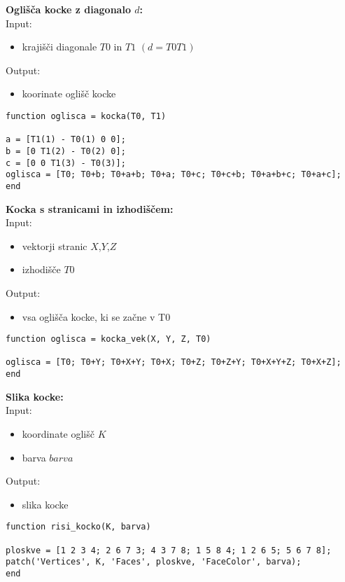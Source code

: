 \documentclass[12pt,a4paper,twoside]{article}
\theoremstyle{definition} %
\theoremstyle{plain} %
\numberwithin{equation}{section}  %
\begin{document}
\textbf{Oglišča kocke z diagonalo $d$:}\\
Input:
\begin{itemize}
\item krajišči diagonale $T0$ in $T1$ $(d=T0 T1)$
\end{itemize}
Output:
\begin{itemize}
\item koorinate oglišč kocke
\end{itemize}

\begin{lstlisting}[caption = {kocka}]
function oglisca = kocka(T0, T1)

a = [T1(1) - T0(1) 0 0];
b = [0 T1(2) - T0(2) 0];
c = [0 0 T1(3) - T0(3)];
oglisca = [T0; T0+b; T0+a+b; T0+a; T0+c; T0+c+b; T0+a+b+c; T0+a+c];
end
\end{lstlisting}

\vspace{1cm}
\textbf{Kocka s stranicami in izhodiščem:}\\
Input:
\begin{itemize}
\item vektorji stranic $X$,$Y$,$Z$
\item izhodišče $T0$
\end{itemize}
Output:
\begin{itemize}
\item vsa oglišča kocke, ki se začne v T0
\end{itemize}

\begin{lstlisting}[caption = {kocka\_vek}]
function oglisca = kocka_vek(X, Y, Z, T0)

oglisca = [T0; T0+Y; T0+X+Y; T0+X; T0+Z; T0+Z+Y; T0+X+Y+Z; T0+X+Z];
end
\end{lstlisting}

\vspace{1cm}
\textbf{Slika kocke:}\\
Input:
\begin{itemize}
\item koordinate oglišč $K$
\item barva $barva$
\end{itemize}
Output:
\begin{itemize}
\item slika kocke
\end{itemize}

\begin{lstlisting}[caption = {risi\_kocko}]
function risi_kocko(K, barva)

ploskve = [1 2 3 4; 2 6 7 3; 4 3 7 8; 1 5 8 4; 1 2 6 5; 5 6 7 8]; 
patch('Vertices', K, 'Faces', ploskve, 'FaceColor', barva);
end
\end{lstlisting}
\end{document}
